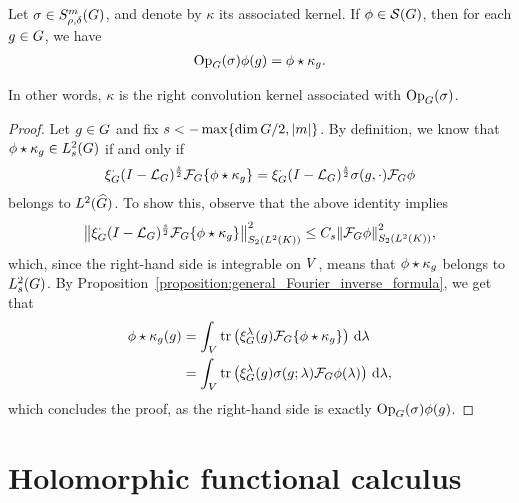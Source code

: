 \begin{proposition}[Quantisation]
\label{proposition:quantisation}
    Let $\sigma \in \SymbolClass{m}{\rho, \delta}$,
    and denote by $\kappa$ its associated kernel.
    If $\phi \in \Schwartz\Group$, then for each $g \in \Group$, we have
    \begin{align*}
        \Op(\sigma) \phi(g) = \conv{\phi}{\kappa_g}.
    \end{align*}

    In other words, $\kappa$ is the right convolution kernel associated with $\Op(\sigma)$.
\end{proposition}
\begin{proof}
    Let $g \in \Group$ and fix $s < -\max \{\dim \Group/2, \abs m\}$.
    By definition, we know that $\conv \phi \kappa_g \in \Sobolev s$ if and only if
    \begin{align*}
        \Rep \dummy \BesselPotential s \Fourier \{\conv \phi {\kappa_g}\}
        = \Rep \dummy \BesselPotential s \sigma(g, \dummy) \Fourier \phi
    \end{align*}
    belongs to $\LebesgueDual 2 \Group$.
    To show this,
    observe that the above identity implies
    \begin{align*}
        \norm[\SchattenClasses 2 {\Lebesgue 2 \CompactGroup}] {\Rep \dummy \BesselPotential s \Fourier \{\conv \phi {\kappa_g}\}}^2
        \leq C_s \norm[\SchattenClasses 2 {\Lebesgue 2 \CompactGroup}] {\Fourier \phi}^2,
    \end{align*}
    which, since the right-hand side is integrable on $\VectorSpace$,
    means that $\conv \phi {\kappa_g}$ belongs to $\Sobolev s$.
    By Proposition~\ref{proposition:general_Fourier_inverse_formula},
    we get that
    \begin{align*}
        \conv \phi {\kappa_g}(g)
        &= \int_\VectorSpace \tr\left(\Rep \lambda(g) \Fourier \{\conv \phi {\kappa_g}\}\right) \dd \lambda\\
        &= \int_\VectorSpace \tr\left(\Rep \lambda(g) \sigma(g; \lambda) \Fourier \phi(\lambda)\right) \dd \lambda,
    \end{align*}
    which concludes the proof,
    as the right-hand side is exactly $\Op(\sigma) \phi(g)$.
\end{proof}

\section{Holomorphic functional calculus}

